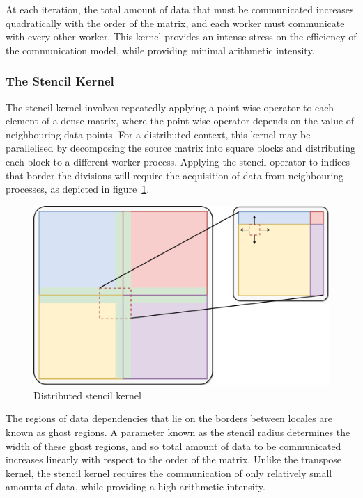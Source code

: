 At each iteration, the total amount of data that must be communicated
increases quadratically with the order of the matrix, and each worker
must communicate with every other worker. This kernel provides an
intense stress on the efficiency of the communication model, while
providing minimal arithmetic intensity.

\subsubsection{The Stencil Kernel}

The stencil kernel involves repeatedly applying a point-wise operator to
each element of a dense matrix, where the point-wise operator depends on
the value of neighbouring data points. For a distributed context, this
kernel may be parallelised by decomposing the source matrix into square
blocks and distributing each block to a different worker process.
Applying the stencil operator to indices that border the divisions will
require the acquisition of data from neighbouring processes, as depicted
in figure~\ref{fig:stencil-diagram}.

\begin{figure}[htb]
  \includegraphics[width=\linewidth]{figs/Stencil.pdf}
  \caption{Distributed stencil kernel}
  \label{fig:stencil-diagram}
\end{figure}

The regions of data dependencies that lie on the borders between locales
are known as ghost regions. A parameter known as the stencil radius
determines the width of these ghost regions, and so total amount of data
to be communicated increases linearly with respect to the order of the
matrix. Unlike the transpose kernel, the stencil kernel requires the
communication of only relatively small amounts of data, while providing
a high arithmetic intensity.
